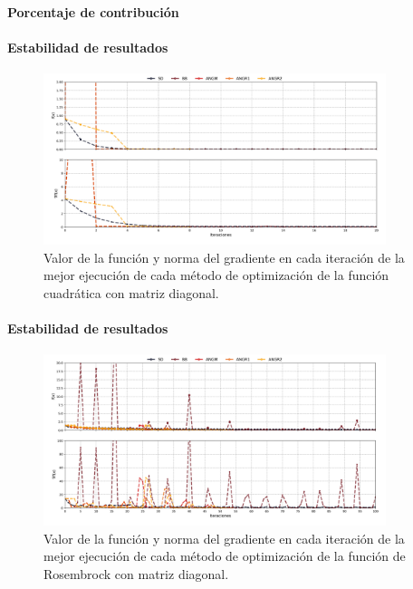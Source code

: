 \begin{frame}{\insertsectionhead}
    \framesubtitle{Porcentaje de contribución}
    
\end{frame}

\begin{frame}{\insertsectionhead}
    \framesubtitle{Estabilidad de resultados}
    \begin{figure}[H]
        \centering
        \includegraphics[width=10cm]{Graphics/function/quadratic.png}
        \caption{Valor de la función y norma del gradiente en cada iteración de la mejor ejecución de cada método de optimización de la función cuadrática con matriz diagonal.}
        \label{fig:quadracic_function}
    \end{figure}
\end{frame}

\begin{frame}{\insertsectionhead}
    \framesubtitle{Estabilidad de resultados}
    \begin{figure}[H]
        \centering
        \includegraphics[width=10cm]{Graphics/function/rosembrock.png}
        \caption{Valor de la función y norma del gradiente en cada iteración de la mejor ejecución de cada método de optimización de la función de Rosembrock con matriz diagonal.}
        \label{fig:rosembrock_function}
    \end{figure}
\end{frame}

\begin{frame}
    \vspace{0.5cm}
    
\end{frame}

\begin{frame}
    \vspace{0.5cm}
    
\end{frame}